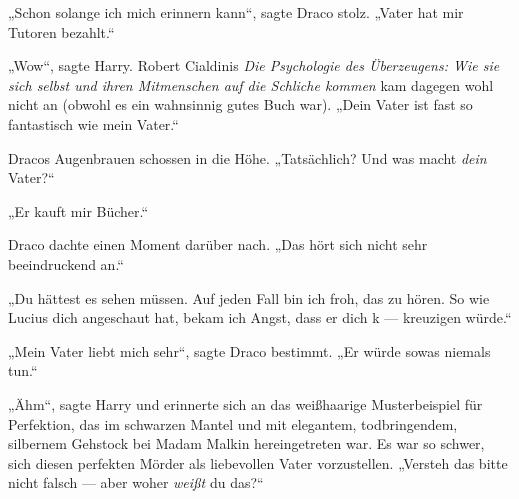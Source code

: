 „Schon solange ich mich erinnern kann“, sagte Draco stolz.
„Vater hat mir Tutoren bezahlt.“

„Wow“, sagte Harry. Robert Cialdinis \emph{Die Psychologie des Überzeugens: Wie sie sich selbst und ihren Mitmenschen auf die Schliche kommen} kam dagegen wohl nicht an (obwohl es ein wahnsinnig gutes Buch war).
„Dein Vater ist fast so fantastisch wie mein Vater.“%

Dracos Augenbrauen schossen in die Höhe.
„Tatsächlich? Und was macht \emph{dein} Vater?“

„Er kauft mir Bücher.“

Draco dachte einen Moment darüber nach.
„Das hört sich nicht sehr beeindruckend an.“

„Du hättest es sehen müssen. Auf jeden Fall bin ich froh, das zu hören. So wie Lucius dich angeschaut hat, bekam ich Angst, dass er dich k — kreuzigen würde.“

„Mein Vater liebt mich sehr“, sagte Draco bestimmt.
„Er würde sowas niemals tun.“

„Ähm“, sagte Harry und erinnerte sich an das weißhaarige Musterbeispiel für Perfektion, das im schwarzen Mantel und mit elegantem, todbringendem, silbernem Gehstock bei Madam Malkin hereingetreten war. Es war so schwer, sich diesen perfekten Mörder als liebevollen Vater vorzustellen.
„Versteh das bitte nicht falsch — aber woher \emph{weißt} du das?“

